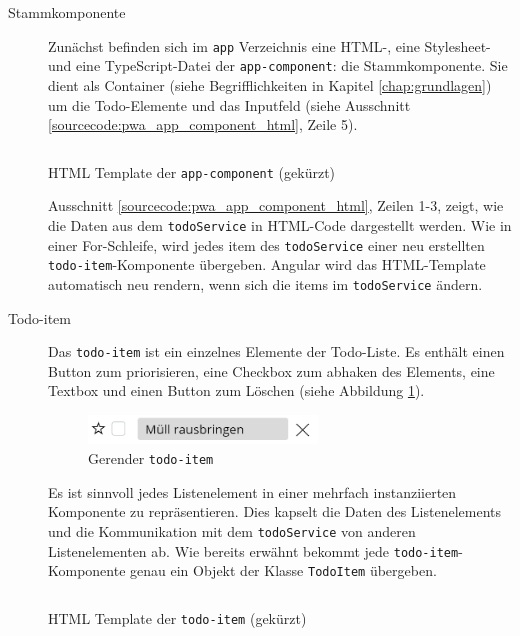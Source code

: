 \begin{description}
	\item[Stammkomponente] Zunächst befinden sich im \texttt{app} Verzeichnis eine HTML-, eine Stylesheet- und eine TypeScript-Datei der \texttt{app-component}: die Stammkomponente. Sie dient als Container (siehe Begrifflichkeiten in Kapitel \ref{chap:grundlagen}) um die Todo-Elemente und das Inputfeld (siehe Ausschnitt \ref{sourcecode:pwa_app_component_html}, Zeile 5).
	

		
	\begin{listing}[h]
		\inputminted{text}{sourcecode/pwa_app_component.html}
		\caption{HTML Template der \texttt{app-component} (gekürzt)}
		\label{sourcecode:pwa_app_component_html}
	\end{listing}

	Ausschnitt \ref{sourcecode:pwa_app_component_html}, Zeilen 1-3, zeigt, wie die Daten aus dem \texttt{todoService} in HTML-Code dargestellt werden. Wie in einer For-Schleife, wird jedes item des \texttt{todoService} einer neu erstellten \texttt{todo-item}-Komponente übergeben.
	Angular wird das HTML-Template automatisch neu rendern, wenn sich die items im \texttt{todoService} ändern.	
	
	
	\item[Todo-item] 
	Das \texttt{todo-item} ist ein einzelnes Elemente der Todo-Liste. Es enthält einen Button zum priorisieren, eine Checkbox zum abhaken des Elements, eine Textbox und einen Button zum Löschen (siehe Abbildung \ref{fig:pwa_todo_item_screenshot}).
	
	\begin{figure}[h]
		\includegraphics[width=0.6\textwidth]{img/pwa_todo_item.PNG}
		\centering
		\caption{Gerender \texttt{todo-item}}
		\label{fig:pwa_todo_item_screenshot}
	\end{figure}
	
	
	Es ist sinnvoll jedes Listenelement in einer mehrfach instanziierten Komponente zu repräsentieren. Dies kapselt die Daten des Listenelements und die Kommunikation mit dem \texttt{todoService} von anderen Listenelementen ab. Wie bereits erwähnt bekommt jede \texttt{todo-item}-Komponente genau ein Objekt der Klasse \texttt{TodoItem} übergeben.
	
	\begin{listing}[h]
		\inputminted{text}{sourcecode/pwa_todo_item.html}
		\caption{HTML Template der \texttt{todo-item} (gekürzt)}
		\label{sourcecode:pwa_todo_item_html}
	\end{listing}


\end{description}
